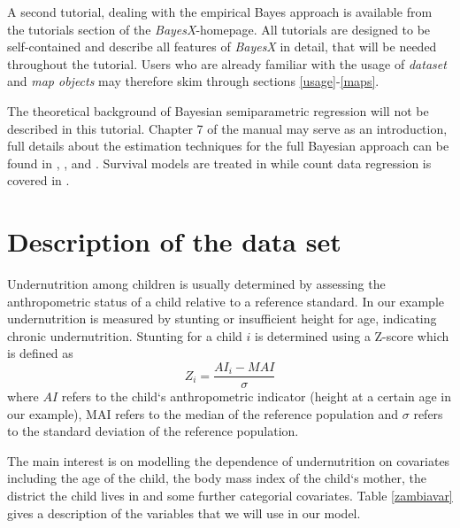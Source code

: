 \documentclass[a4paper]{article}
\begin{document}
A second tutorial, dealing with the empirical Bayes approach is
available from the tutorials section of the {\it BayesX}-homepage.
All tutorials are designed to be self-contained and describe all
features of {\it BayesX} in detail, that will be needed throughout
the tutorial. Users who are already familiar with the usage of
{\it dataset} and {\it map objects} may therefore skim through
sections \ref{usage}-\ref{maps}.

The theoretical background of Bayesian semiparametric regression
will not be described in this tutorial. Chapter 7 of the manual may
serve as an introduction, full details about the estimation
techniques for the full Bayesian approach can be found in , ,
 and . Survival models are
treated in  while count data
regression is covered in .

\section{Description of the data set}

Undernutrition among children is usually determined by assessing
the anthropometric status of a child relative to a reference
standard. In our example undernutrition is measured by stunting or
insufficient height for age, indicating chronic undernutrition.
Stunting for a child $i$ is determined using a Z-score which is
defined as
\[Z_i = \frac{AI_i-MAI}{\sigma}\]
where $AI$ refers to the child`s anthropometric indicator (height
at a certain age in our example), MAI refers to the median of the
reference population and $\sigma$ refers to the standard deviation
of the reference population.

The main interest is on modelling the dependence of undernutrition
on covariates including the age of the child, the body mass index
of the child`s mother, the district the child lives in and some
further categorial covariates. Table \ref{zambiavar} gives a
description of the variables that we will use in our model.
\end{document}
